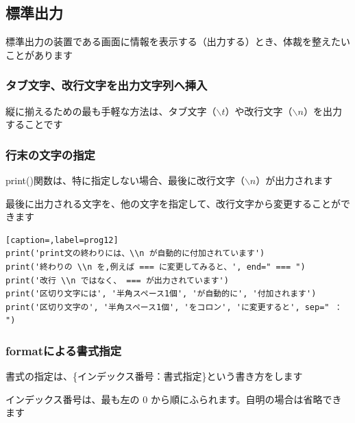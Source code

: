 \documentclass[uplatex,a4paper,11pt,oneside,openany]{jsbook}
\begin{document}
\subsection{標準出力}

標準出力の装置である画面に情報を表示する（出力する）とき、体裁を整えたいことがあります

\subsubsection{タブ文字、改行文字を出力文字列へ挿入}

縦に揃えるための最も手軽な方法は、タブ文字（$\backslash t$）や改行文字（$\backslash n$）を出力することです


\subsubsection{行末の文字の指定}

print()関数は、特に指定しない場合、最後に改行文字（$\backslash n$）が出力されます

最後に出力される文字を、他の文字を指定して、改行文字から変更することができます

\begin{lstlisting}[caption=,label=prog12]
print('print文の終わりには、\\n が自動的に付加されています')
print('終わりの \\n を,例えば === に変更してみると、', end=" === ")
print('改行 \\n ではなく、 === が出力されています')
print('区切り文字には', '半角スペース1個', 'が自動的に', '付加されます')
print('区切り文字の', '半角スペース1個', 'をコロン', 'に変更すると', sep=" ： ")
\end{lstlisting}%


\subsubsection{formatによる書式指定}

書式の指定は、\{インデックス番号：書式指定\}という書き方をします

インデックス番号は、最も左の 0 から順にふられます。自明の場合は省略できます
\end{document}
